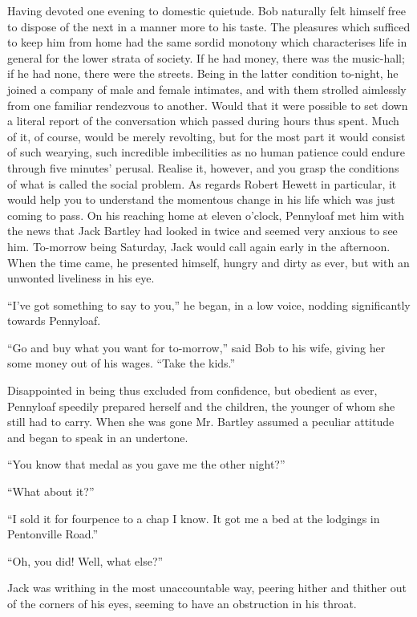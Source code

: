 Having devoted one evening to domestic quietude. Bob naturally felt
himself free to dispose of the next in a manner more to his taste. The
pleasures which sufficed to keep him from home had the same sordid
monotony which characterises life in general for the lower strata of
society. If he had money, there was the music-hall; if he had none,
there were the streets. Being in the latter condition to-night, he
joined a company of male and female intimates, and with them strolled
aimlessly from one familiar rendezvous to another. Would that it were
possible to set down a literal report of the conversation which passed
during hours thus spent. Much of it, of course, would be merely
revolting, but for the most part it would consist of such wearying, such
incredible imbecilities as no human
{\protect\hypertarget{231}{}{}}patience could endure through five
minutes' perusal. Realise it, however, and you grasp the conditions of
what is called the social problem. As regards Robert Hewett in
particular, it would help you to understand the momentous change in his
life which was just coming to pass. On his reaching home at eleven
o'clock, Pennyloaf met him with the news that Jack Bartley had looked in
twice and seemed very anxious to see him. To-morrow being Saturday, Jack
would call again early in the afternoon. When the time came, he
presented himself, hungry and dirty as ever, but with an unwonted
liveliness in his eye.

``I've got something to say to you,'' he began, in a low voice, nodding
significantly towards Pennyloaf.

``Go and buy what you want for to-morrow,'' said Bob to his wife, giving
her some money out of his wages. ``Take the kids.''

Disappointed in being thus excluded from confidence, but obedient as
ever, Pennyloaf speedily prepared herself and the children, the
{\protect\hypertarget{232}{}{}}younger of whom she still had to carry.
When she was gone Mr. Bartley assumed a peculiar attitude and began to
speak in an undertone.

``You know that medal as you gave me the other night?''

``What about it?''

``I sold it for fourpence to a chap I know. It got me a bed at the
lodgings in Pentonville Road.''

``Oh, you did! Well, what else?''

Jack was writhing in the most unaccountable way, peering hither and
thither out of the corners of his eyes, seeming to have an obstruction
in his throat.


